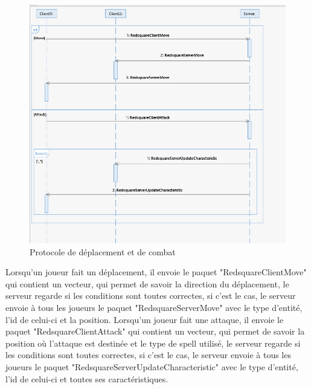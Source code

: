 \documentclass[a4paper, 12pt, twoside]{article}
\begin{document}
\begin{figure}[H]
    \includegraphics[scale=0.65]{./Diagramme/Deplacement}
    \caption{Protocole de déplacement et de combat}
\end{figure}
Lorsqu'un joueur fait un déplacement, il envoie le paquet "RedsquareClientMove" qui contient un vecteur, qui permet de savoir la direction du déplacement, le serveur regarde si les conditions sont toutes correctes, si c'est le cas, le serveur envoie à tous les joueurs le paquet "RedsquareServerMove" avec le type d'entité, l'id de celui-ci et la position.
Lorsqu'un joueur fait une attaque, il envoie le paquet "RedsquareClientAttack" qui contient un vecteur, qui permet de savoir la position où l'attaque est destinée et le type de spell utilisé, le serveur regarde si les conditions sont toutes correctes, si c'est le cas, le serveur envoie à tous les joueurs le paquet "RedsquareServerUpdateCharacteristic" avec le type d'entité, l'id de celui-ci et toutes ses caractéristiques.
\newpage
\end{document}
